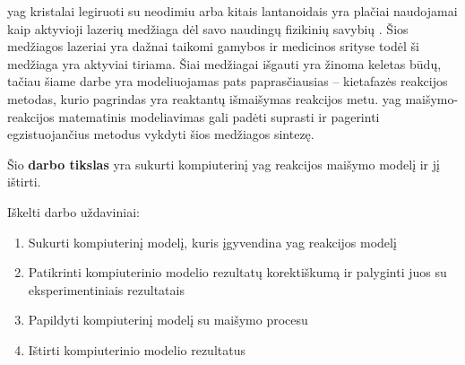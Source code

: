 




\ac{yag} kristalai legiruoti su neodimiu arba kitais lantanoidais yra plačiai naudojamai kaip aktyvioji lazerių medžiaga dėl savo naudingų fizikinių savybių \cite{?}. Šios medžiagos lazeriai yra dažnai taikomi gamybos ir medicinos srityse \cite{dubeyExperimentalStudyNd2008, valentiUseErYAG2021} todėl ši medžiaga yra aktyviai tiriama. Šiai medžiagai išgauti yra žinoma keletas būdų, tačiau šiame darbe yra modeliuojamas pats paprasčiausias -- kietafazės reakcijos metodas, kurio pagrindas yra reaktantų išmaišymas reakcijos metu. \acs{yag} maišymo-reakcijos matematinis modeliavimas gali padėti suprasti ir pagerinti egzistuojančius metodus vykdyti šios medžiagos sintezę.   


Šio \textbf{darbo tikslas} yra sukurti kompiuterinį \acs{yag} reakcijos maišymo modelį ir jį ištirti.

Iškelti darbo uždaviniai:

\begin{enumerate}
\item Sukurti kompiuterinį modelį, kuris įgyvendina \acs{yag} reakcijos modelį
\item Patikrinti kompiuterinio modelio rezultatų korektiškumą ir palyginti juos su eksperimentiniais rezultatais
\item Papildyti kompiuterinį modelį su maišymo procesu
\item Ištirti kompiuterinio modelio rezultatus
\end{enumerate}